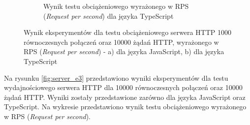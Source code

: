 \begin{figure}[H]
\begin{subfigure}[b]{0.4\textwidth}
    \caption{Wynik testu obciążeniowego wyrażonego w RPS (\textit{Request per second}) dla języka TypeScript}
    \label{fig:server_e2_ts}
  \end{subfigure}
  \caption{Wynik eksperymentów dla testu obciążeniowego serwera HTTP 1000 równoczesnych połączeń oraz 10000 żądań HTTP, wyrażonego w RPS (\textit{Request per second}) - a) dla języka JavaScript, b) dla języka TypeScript}
  \label{fig:server_e2}
\end{figure}

Na rysunku \ref{fig:server_e3} przedstawiono wyniki eksperymentów dla testu wydajnościowego serwera HTTP dla 10000 równoczesnych połączeń oraz 10000 żądań HTTP. Wyniki zostały przedstawione zarówno dla języka JavaScript oraz TypeScript. Na wykresie przedstawiono wynik testu obciążeniowego wyrażonego w RPS (\textit{Request per second}).

